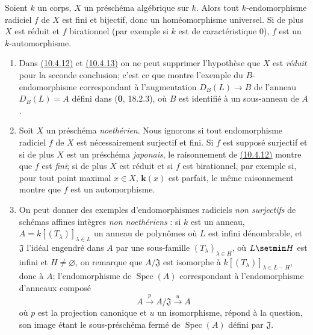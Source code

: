 \begin{corollary}[10.4.13]
Soient $k$ un corps, $X$ un préschéma algébrique sur $k$. Alors tout
$k$-endomorphisme radiciel $f$ de $X$ est fini et bijectif, donc un
homéomorphisme universel. Si de plus $X$ est réduit et $f$ birationnel
\textup{(par exemple si $k$ est de caractéristique 0)}, $f$ est un
$k$-automorphisme.
\end{corollary}

\begin{remarks}[10.4.14]
\label{IV.10.4.14}
\begin{enumerate}[label=\textup{(\roman*)}]
\item Dans {\hyperlink{ega4.c04.cor.10-4-12}{(10.4.12)}} et
{\hyperlink{ega4.c04.cor.10-4-13}{(10.4.13)}} on ne peut supprimer
l'hypothèse que $X$ est \emph{réduit} pour la seconde conclusion; c'est ce que
montre l'exemple du $B$-endomorphisme correspondant à l'augmentation
$D_B(L)\to B$ de l'anneau $D_B(L)=A$ défini dans (\textbf{0}, 18.2.3), où
$B$ est identifié à un sous-anneau de $A$.

\item Soit $X$ un préschéma \emph{noethérien}. Nous ignorons si tout
endomorphisme radiciel $f$ de $X$ est nécessairement surjectif et fini.
Si $f$ est supposé surjectif et si de plus $X$ est un préschéma
\emph{japonais}, le raisonnement de
{\hyperlink{ega4.c04.cor.10-4-12}{(10.4.12)}} montre que $f$ est \emph{fini};
si de plus $X$ est réduit et si $f$ est birationnel, par exemple si,
pour tout point maximal $x\in X$, $\boldsymbol{k}(x)$ est parfait, le même
raisonnement montre que $f$ est un automorphisme.

\item On peut donner des exemples d'endomorphismes radiciels \emph{non
surjectifs} de schémas affines intègres \emph{non noethériens} : si $k$ est un
anneau, $A=k[(T_\lambda)]_{\lambda\in L}$ un anneau de polynômes où $L$
est infini dénombrable, et $\mathfrak J$ l'idéal engendré dans $A$ par
une sous-famille $(T_\lambda)_{\lambda\in H}$, où $L\setmin H$ est infini et
$H\neq\varnothing$, on remarque que $A/\mathfrak J$ est isomorphe à
$k[(T_\lambda)]_{\lambda\in L-H}$, donc à $A$; l'endomorphisme de
$\operatorname{Spec}(A)$ correspondant à l'endomorphisme d'anneaux
composé
\[
 A\xrightarrow{p}A/\mathfrak J\xrightarrow{u}A
\]
où $p$ est la projection canonique et $u$ un isomorphisme, répond à la
question, son image étant le sous-préschéma fermé de
$\operatorname{Spec}(A)$ défini par $\mathfrak J$.
\end{enumerate}
\end{remarks}

